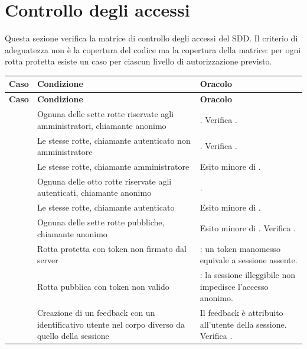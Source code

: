 \section{Controllo degli accessi}
\label{sec:td-tc-accessi}

Questa sezione verifica la matrice di controllo degli accessi del SDD. Il
criterio di adeguatezza non è la copertura del codice ma la copertura della
matrice: per ogni rotta protetta esiste un caso per ciascun livello di
autorizzazione previsto.

\begin{longtable}{@{}l L{5.0cm} L{7.4cm}@{}}
\toprule
\textbf{Caso} & \textbf{Condizione} & \textbf{Oracolo} \\
\midrule
\endfirsthead
\toprule
\textbf{Caso} & \textbf{Condizione} & \textbf{Oracolo} \\
\midrule
\endhead
\bottomrule
\endlastfoot

 & Ognuna delle sette rotte riservate agli amministratori,
  chiamante anonimo & . Verifica . \\

 & Le stesse rotte, chiamante autenticato non amministratore &
  . Verifica . \\

 & Le stesse rotte, chiamante amministratore &
  Esito minore di . \\

 & Ognuna delle otto rotte riservate agli autenticati,
  chiamante anonimo & . \\

 & Le stesse rotte, chiamante autenticato &
  Esito minore di . \\

 & Ognuna delle sette rotte pubbliche, chiamante anonimo &
  Esito minore di . Verifica . \\

 & Rotta protetta con token non firmato dal server &
  : un token manomesso equivale a sessione assente. \\

 & Rotta pubblica con token non valido &
  : la sessione illeggibile non impedisce l'accesso anonimo. \\

 & Creazione di un feedback con un identificativo utente nel
  corpo diverso da quello della sessione &
  Il feedback è attribuito all'utente della sessione. Verifica
  . \\


\end{longtable}
